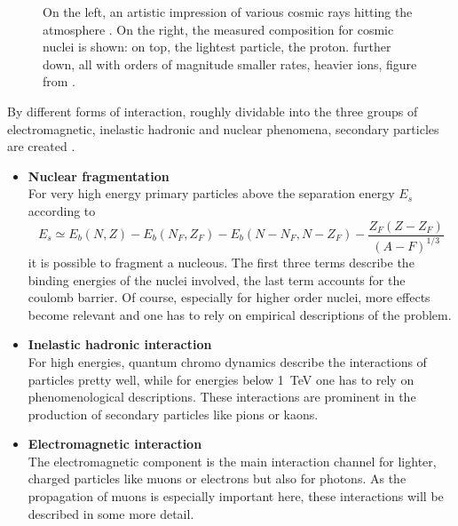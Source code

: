 \begin{figure}
\begin{minipage}[d]{0.49 \textwidth}
	\end{minipage}
	\caption[Cosmic ray composition]{On the left, an artistic impression of various cosmic rays hitting the atmosphere \cite{airShower}. On the right, the measured composition for cosmic nuclei is shown: on top, the lightest particle, the proton. further down, all with orders of magnitude smaller rates, heavier ions, figure from \cite{highEnergyCosmicRays}.}
	\label{fig:Introduction:sec:CosmicRays}
    \end{figure}
    By different forms of interaction, roughly dividable into the three groups of electromagnetic, inelastic hadronic and nuclear phenomena, secondary particles are created \cite{highEnergyCosmicRays, Grupen}. 
    \begin{itemize}
    	\item {\bf Nuclear fragmentation}\\
    	For very high energy primary particles above the separation energy $E_s$ according to 
		\begin{equation}
			E_s \simeq E_b(N,Z) - E_b(N_F, Z_F) - E_b(N - N_F, N - Z_F) - \frac{Z_F(Z -Z_F)}{(A-F)^{1/3}}
		\end{equation}
		it is possible to fragment a nucleous. The first three terms describe the binding energies of the nuclei involved, the last term accounts for the coulomb barrier. Of course, especially for higher order nuclei, more effects become relevant and one has to rely on empirical descriptions of the problem.
		\item{\bf Inelastic hadronic interaction}\\
		For high energies, quantum chromo dynamics describe the interactions of particles pretty well, while for energies below \SI{1}{\TeV} one has to rely on phenomenological descriptions. These interactions are prominent in the production of secondary particles like pions or kaons.
		
		\item{\bf Electromagnetic interaction}\\
		The electromagnetic component is the main interaction channel for lighter, charged particles like muons or electrons but also for photons. As the propagation of muons is especially important here, these interactions will be described in some more detail.
	

\end{itemize}
